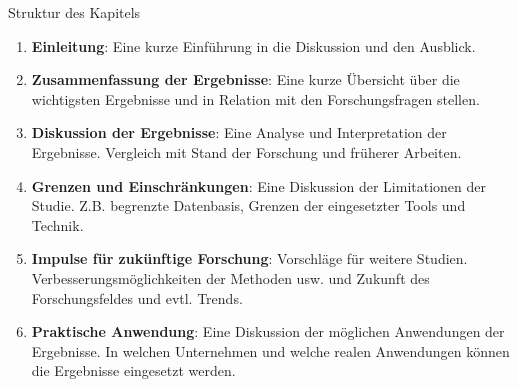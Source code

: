 \begin{tcolorbox}[
	enhanced,
	colback=red!5!white,
	colframe=red!75!black!50,
	title= Mein roter Faden
	]
	Struktur des Kapitels
	
	\begin{enumerate}
		\item \textbf{Einleitung}: Eine kurze Einführung in die Diskussion und den Ausblick.
		\item \textbf{Zusammenfassung der Ergebnisse}: Eine kurze Übersicht über die wichtigsten Ergebnisse und in Relation mit den Forschungsfragen stellen.
		\item \textbf{Diskussion der Ergebnisse}: Eine Analyse und Interpretation der Ergebnisse. Vergleich mit Stand der Forschung und früherer Arbeiten.
		\item \textbf{Grenzen und Einschränkungen}: Eine Diskussion der Limitationen der Studie. Z.B. begrenzte Datenbasis, Grenzen der eingesetzter Tools und Technik.
		\item \textbf{Impulse für zukünftige Forschung}: Vorschläge für weitere Studien. Verbesserungsmöglichkeiten der Methoden usw. und Zukunft des Forschungsfeldes und evtl. Trends.
		\item \textbf{Praktische Anwendung}: Eine Diskussion der möglichen Anwendungen der Ergebnisse. In welchen Unternehmen und welche realen Anwendungen können die Ergebnisse eingesetzt werden.
	\end{enumerate}
\end{tcolorbox}
